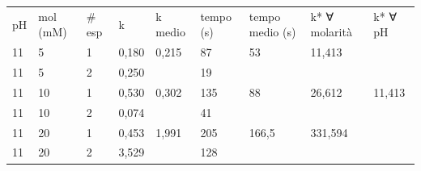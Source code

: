 \begin{center}
\begin{tabular}{lllllllll}
pH & mol (mM) & \# esp & k           & k medio     & tempo (s) & tempo medio (s) & k* ∀ molarità & k* ∀ pH     \\
11 & 5            & 1              & 0,180 & 0,215 & 87        & 53              & 11,413   &             \\
11 & 5             & 2              & 0,250 &             & 19        &                 &               &             \\
11 & 10            & 1              & 0,530 & 0,302 & 135       & 88              & 26,612   & 11,413 \\
11 & 10            & 2              & 0,074 &             & 41        &                 &               &             \\
11 & 20            & 1              & 0,453 & 1,991 & 205       & 166,5           & 331,594   &             \\
11 & 20            & 2              & 3,529 &             & 128       &                 &               &            

\end{tabular}
\end{center}
\pagebreak

